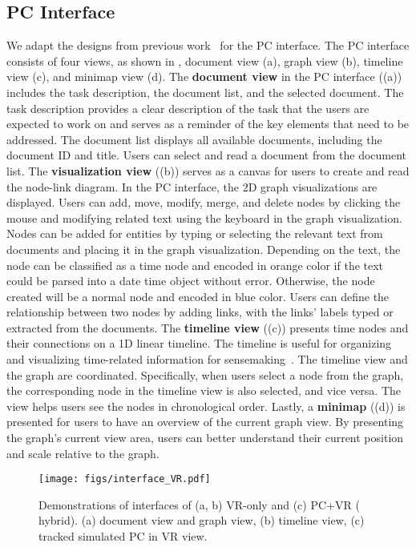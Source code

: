 \subsection{PC Interface}
We adapt the designs from previous work~\cite{mahyar2014supporting,tong2023towards} for the PC interface.
The PC interface consists of four views, as shown in , document view (a), graph view (b), timeline view (c), and minimap view (d). 
The \textbf{document view} in the PC interface ((a)) includes the task description, the document list, and the selected document. The task description provides a clear description of the task that the users are expected to work on and serves as a reminder of the key elements that need to be addressed. The document list displays all available documents, including the document ID and title. Users can select and read a document from the document list. 
The \textbf{visualization view} ((b)) serves as a canvas for users to create and read the node-link diagram. In the PC interface, the 2D graph visualizations are displayed. 
Users can add, move, modify, merge, and delete nodes by clicking the mouse and modifying related text using the keyboard in the graph visualization.
Nodes can be added for entities by typing or selecting the relevant text from documents and placing it in the graph visualization. Depending on the text, the node can be classified as a time node and encoded in orange color if the text could be parsed into a date time object without error. Otherwise, the node created will be a normal node and encoded in blue color.
Users can define the relationship between two nodes by adding links, with the links' labels typed or extracted from the documents.
The \textbf{timeline view} ((c)) presents time nodes and their connections on a 1D linear timeline.
The timeline is useful for organizing and visualizing time-related information for sensemaking~\cite{mahyar2014supporting}.
The timeline view and the graph are coordinated. Specifically, when users select a node from the graph, the corresponding node in the timeline view is also selected, and vice versa. The view helps users see the nodes in chronological order.
Lastly, a \textbf{minimap} ((d)) is presented for users to have an overview of the current graph view. By presenting the graph's current view area, users can better understand their current position and scale relative to the graph.

\begin{figure}
\centering
\texttt{[image: figs/interface\_VR.pdf]}
\caption{Demonstrations of interfaces of (a, b) VR-only and (c) PC+VR (\aka{} hybrid). (a) document view and graph view, (b) timeline view, (c) tracked simulated PC in VR view.}
\label{fig:vr_hybrid_interface}
\end{figure}

